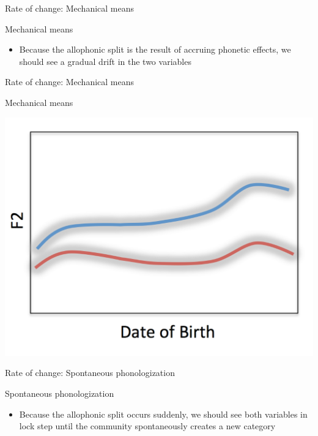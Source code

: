 \documentclass[hyperref={pdfpagelabels=false}]{beamer}
\begin{document}
\begin{frame}{Rate of change: Mechanical means}
	\begin{block}{Mechanical means}
		\begin{itemize}
			\item Because the allophonic split is the result of accruing phonetic effects, we should see a gradual drift in the two variables
		\end{itemize}
	\end{block}	
\end{frame}

\begin{frame}{Rate of change: Mechanical means}
	\begin{block}{Mechanical means}
		\begin{center}
		\includegraphics[trim=2cm 2cm 2cm 2cm, clip=false, width=.6\textwidth]{MechROC.pdf}
		\end{center}
	\end{block}	
\end{frame}

\begin{frame}{Rate of change: Spontaneous phonologization}
	\begin{block}{Spontaneous phonologization}
		\begin{itemize}
			\item Because the allophonic split occurs suddenly, we should see both variables in lock step until the community spontaneously creates a new category 
		\end{itemize}
	\end{block}
\end{frame}
\end{document}
